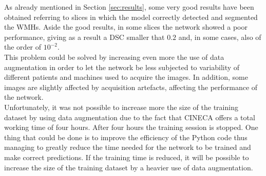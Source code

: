 \documentclass[12pt]{extarticle}
\begin{document}
As already mentioned in Section \ref{sec:results}, some very good results have been obtained referring to slices in which the model correctly detected and segmented the WMHs. 
Aside the good results, in some slices the network showed a poor performance, giving as a result a DSC smaller that $0.2$ and, in some cases, also of the order of $10^{-2}$. \\
This problem could be solved by increasing even more the use of data augmentation in order to let the network be less subjected to variability of different patients and machines used to acquire the images. 
In addition, some images are slightly affected by acquisition artefacts, affecting the performance of the network. \\[4pt]
Unfortunately, it was not possible to increase more the size of the training dataset by using data augmentation due to the fact that CINECA offers a total working time of four hours. After four hours the training session is stopped.
One thing that could be done is to improve the efficiency of the Python code thus managing to greatly reduce the time needed for the network to be trained and make correct predictions.
If the training time is reduced, it will be possible to increase the size of the training dataset by a heavier use of data augmentation.

\clearpage


\end{document}
